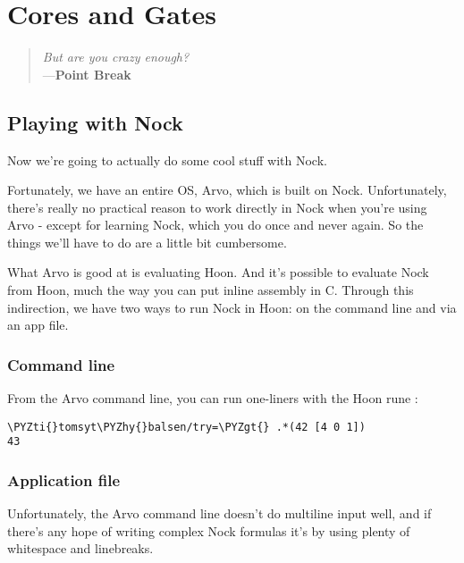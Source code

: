 \chapter{Cores and Gates}

\begin{quote}
\noindent \emph{But are you crazy enough?}
\medskip \\
---\textbf{Point Break}
\end{quote}

\section{Playing with Nock}

Now we're going to actually do some cool stuff with Nock.

Fortunately, we have an entire OS, Arvo, which is built on Nock.
Unfortunately, there's really no practical reason to work
directly in Nock when you're using Arvo - except for learning
Nock, which you do once and never again.  So the things we'll
have to do are a little bit cumbersome.

What Arvo is good at is evaluating Hoon.  And it's possible to
evaluate Nock from Hoon, much the way you can put inline assembly
in C.  Through this indirection, we have two ways to run Nock in
Hoon: on the command line and via an app file.

\subsection{Command line}

From the Arvo command line, you can run one-liners with the Hoon
rune :

\begin{framed_shaded}
\begin{Verbatim}[fontsize=\relsize{-2.5},commandchars=\\\{\}]
\PYZti{}tomsyt\PYZhy{}balsen/try=\PYZgt{} .*(42 [4 0 1])
43
\end{Verbatim}
\end{framed_shaded}

\subsection{Application file}

Unfortunately, the Arvo command line doesn't do multiline input
well, and if there's any hope of writing complex Nock formulas
it's by using plenty of whitespace and linebreaks.

